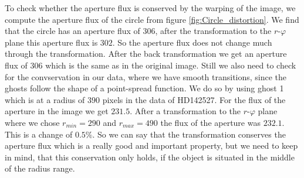 To check whether the aperture flux is conserved by the warping of the image, we compute the aperture flux of the circle from figure \ref{fig:Circle_distortion}. We find that the circle has an aperture flux of $306$, after the transformation to the $r$-$\varphi$ plane this aperture flux is $302$. So the aperture flux does not change much through the transformation. After the back transformation we get an aperture flux of $306$ which is the same as in the original image. Still we also need to check for the convservation in our data, where we have smooth transitions, since the ghosts follow the shape of a point-spread function. We do so by using ghost 1 which is at a radius of $390$ pixels in the data of HD142527. For the flux of the aperture in the image we get $231.5$. After a transformation to the $r$-$\varphi$ plane where we chose $r_{min}=290$ and $r_{max}=490$ the flux of the aperture was $232.1$. This is a change of $0.5 \%$. So we can say that the transformation conserves the aperture flux which is a really good and important property, but we need to keep in mind, that this conservation only holds, if the object is situated in the middle of the radius range.